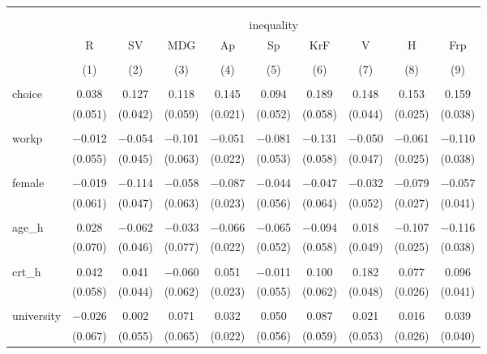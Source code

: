 
\begin{table}[!htbp] \centering 
  \caption{} 
  \label{} 
\begin{tabular}{@{\extracolsep{5pt}}lccccccccc} 
\\[-1.8ex]\hline 
\hline \\[-1.8ex] 
\\[-1.8ex] & \multicolumn{9}{c}{inequality} \\ 
 & R & SV & MDG & Ap & Sp & KrF & V & H & Frp \\ 
\\[-1.8ex] & (1) & (2) & (3) & (4) & (5) & (6) & (7) & (8) & (9)\\ 
\hline \\[-1.8ex] 
 choice & 0.038 & 0.127 & 0.118 & 0.145 & 0.094 & 0.189 & 0.148 & 0.153 & 0.159 \\ 
  & (0.051) & (0.042) & (0.059) & (0.021) & (0.052) & (0.058) & (0.044) & (0.025) & (0.038) \\ 
  & & & & & & & & & \\ 
 workp & $-$0.012 & $-$0.054 & $-$0.101 & $-$0.051 & $-$0.081 & $-$0.131 & $-$0.050 & $-$0.061 & $-$0.110 \\ 
  & (0.055) & (0.045) & (0.063) & (0.022) & (0.053) & (0.058) & (0.047) & (0.025) & (0.038) \\ 
  & & & & & & & & & \\ 
 female & $-$0.019 & $-$0.114 & $-$0.058 & $-$0.087 & $-$0.044 & $-$0.047 & $-$0.032 & $-$0.079 & $-$0.057 \\ 
  & (0.061) & (0.047) & (0.063) & (0.023) & (0.056) & (0.064) & (0.052) & (0.027) & (0.041) \\ 
  & & & & & & & & & \\ 
 age\_h & 0.028 & $-$0.062 & $-$0.033 & $-$0.066 & $-$0.065 & $-$0.094 & 0.018 & $-$0.107 & $-$0.116 \\ 
  & (0.070) & (0.046) & (0.077) & (0.022) & (0.052) & (0.058) & (0.049) & (0.025) & (0.038) \\ 
  & & & & & & & & & \\ 
 crt\_h & 0.042 & 0.041 & $-$0.060 & 0.051 & $-$0.011 & 0.100 & 0.182 & 0.077 & 0.096 \\ 
  & (0.058) & (0.044) & (0.062) & (0.023) & (0.055) & (0.062) & (0.048) & (0.026) & (0.041) \\ 
  & & & & & & & & & \\ 
 university & $-$0.026 & 0.002 & 0.071 & 0.032 & 0.050 & 0.087 & 0.021 & 0.016 & 0.039 \\ 
  & (0.067) & (0.055) & (0.065) & (0.022) & (0.056) & (0.059) & (0.053) & (0.026) & (0.040) \\ 

\end{tabular}
\end{table}
